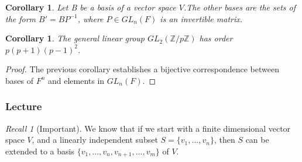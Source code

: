 \documentclass[12pt]{article}
\newtheorem{cor}[thm]{Corollary}
\theoremstyle{definition}
\theoremstyle{remark}
\newtheorem*{rec}{Recall}
\numberwithin{equation}{section}
\newcommand\Z{\mathbb Z}    %
\begin{document}
\vspace{15pt}

\begin{cor}
        Let B be a basis of a vector space $V$.The other bases are the sets of the form $B' = BP^{-1}$, where $P \in GL_n(F)$ is an invertible matrix.
\end{cor}

\vspace{15pt}

\begin{cor}
        The general linear group $GL_2(\Z/p\Z)$ has order $p(p+1)(p-1)^2$.
\end{cor}
\begin{proof}
        The previous corollary establishes a bijective correspondence between bases of $F^n$ and elements in $GL_n(F)$.
\end{proof}

\vspace{15pt}

\subsubsection{Lecture}

\begin{rec}[Important]
        We know that if we start with a finite dimensional vector space $V$, and a linearly independent subset $S = \{v_1,...,v_n\}$, then $S$ can be extended to a basis $\{v_1,...,v_n,v_{n+1},...,v_m\}$ of $V$. 
\end{rec}
\end{document}
